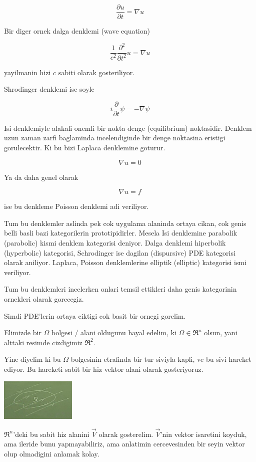\documentclass[12pt,fleqn]{article}
\begin{document}
\[ \frac{\partial u}{\partial t} = 
\nabla  u
\]

Bir diger ornek dalga denklemi (wave equation)

\[ \frac{1}{c^2} \frac{\partial ^2}{\partial t^2}u = \nabla u\]

yayilmanin hizi $c$ sabiti olarak gosteriliyor. 

Shrodinger denklemi ise soyle

\[ i \frac{\partial }{\partial t}\psi  = -\nabla \psi \]

Isi denklemiyle alakali onemli bir nokta denge (equilibrium)
noktasidir. Denklem uzun zaman zarfi baglaminda incelendiginde bir denge
noktasina eristigi gorulecektir. Ki bu bizi Laplaca denklemine goturur. 

\[ \nabla u = 0 \]

Ya da daha genel olarak 

\[ \nabla u = f \]

ise bu denkleme Poisson denklemi adi veriliyor. 

Tum bu denklemler aslinda pek cok uygulama alaninda ortaya cikan, cok genis
belli basli bazi kategorilerin prototipidirler. Mesela Isi denklemine
parabolik (parabolic) kismi denklem kategorisi deniyor. Dalga denklemi
hiperbolik (hyperbolic) kategorisi, Schrodinger ise dagilan (dispursive)
PDE kategorisi olarak aniliyor. Laplaca, Poisson denklemlerine elliptik
(elliptic) kategorisi ismi veriliyor. 

Tum bu denklemleri incelerken onlari temsil ettikleri daha genis
kategorinin ornekleri olarak gorecegiz. 

Simdi PDE'lerin ortaya ciktigi cok basit bir ornegi gorelim. 

Elimizde bir $\Omega$ bolgesi / alani oldugunu hayal edelim, ki $\Omega \in
\Re^n$ olsun, 
yani alttaki resimde cizdigimiz $\Re^2$.

Yine diyelim ki bu $\Omega$ bolgesinin etrafinda bir tur siviyla kapli, ve
bu sivi hareket ediyor. Bu hareketi sabit bir hiz vektor alani olarak
gosteriyoruz. 

\includegraphics[height=2cm]{pde_01.png}

$\Re^n$'deki bu sabit hiz alanini $\vec{V}$ olarak gosterelim. $\vec{V}$'nin vektor isaretini 
koyduk, ama ileride bunu yapmayabiliriz, ama anlatimin cercevesinden bir
seyin  vektor olup olmadigini anlamak kolay. 
\end{document}
